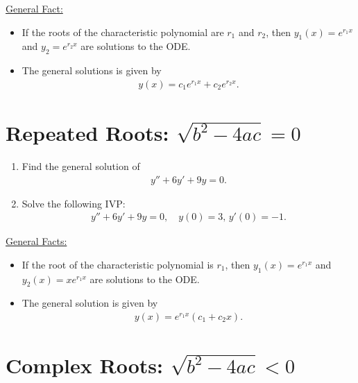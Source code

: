 \documentclass[12pt,a4paper]{article}
\newcounter{example}[section]
\begin{document}
\vfill

\underline{General Fact:}
	\begin{itemize}
	\item If the roots of the characteristic polynomial are $r_1$ and $r_2$, then $y_1 (x) = e^{r_1 x}$ and $y_2 = e^{r_2 x}$ are solutions to the ODE.
	\item The general solutions is given by
		\begin{align*}
		y (x) = c_1 e^{r_1 x} + c_2 e^{r_2 x} .
		\end{align*}
	\end{itemize}
	
\newpage

\section{Repeated Roots: $\sqrt{b^2 - 4ac} = 0$}

\begin{example}
\begin{enumerate}[label=\alph*)]
\item Find the general solution of
	\begin{align*}
	y'' + 6y' + 9y = 0 .
	\end{align*}
\item Solve the following IVP:
	\begin{align*}
	y'' + 6y' + 9y = 0 , \quad y(0) = 3 , \, y' (0) = -1 .
	\end{align*}
\end{enumerate}
\end{example}

\newpage

\phantom{2}

\vfill

\underline{General Facts:}
	\begin{itemize}
	\item If the root of the characteristic polynomial is $r_1$, then $y_1 (x) = e^{r_1 x}$ and $y_2 (x) = x e^{r_1 x}$ are solutions to the ODE.
	\item The general solution is given by
		\begin{align*}
		y(x) = e^{r_1 x} (c_1 + c_2 x ) .
		\end{align*}
	\end{itemize}
	
\newpage

\section{Complex Roots: $\sqrt{b^2 - 4ac} < 0$}
\end{document}
